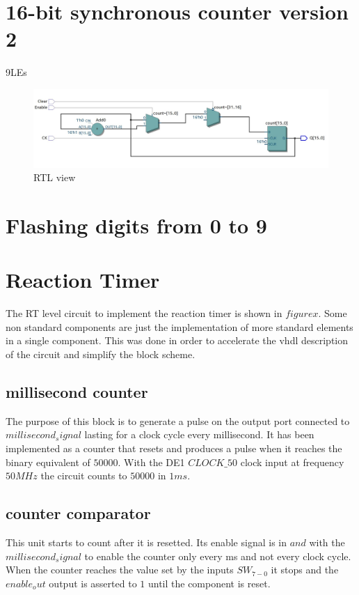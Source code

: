 \documentclass[12pt]{article}
\begin{document}
\section{16-bit synchronous counter version 2}
9LEs
\begin{figure}[h]
	\centering
	\includegraphics[scale = 0.6]{immagini/RTB3.jpg}
	\caption{RTL view}
\end{figure}

\section{Flashing digits from 0 to 9}
\section{Reaction Timer}
The RT level circuit to implement the reaction timer is shown in $figure x$. Some non standard components are just the implementation of more standard elements in a single component. This was done in order to accelerate the vhdl description of the circuit and simplify the block scheme.
\subsection{millisecond counter}
The purpose of this block is to generate a pulse on the output port connected to $millisecond_signal$ lasting for a clock cycle every millisecond. It has been implemented as a counter that resets and produces a pulse when it reaches the binary equivalent of $50000$. With the DE1 $CLOCK\_50$ clock input at frequency $50MHz$ the circuit counts to $50000$ in $1ms$.
\subsection{counter comparator}
This unit starts to count after it is resetted. Its enable signal is in $and$ with the $millisecond_signal$ to enable the counter only every ms and not every clock cycle. \\When the counter reaches the value set by the inputs $SW_{7-0}$ it stops and the $enable_out$ output is asserted to $1$ until the component is reset.
\end{document}
